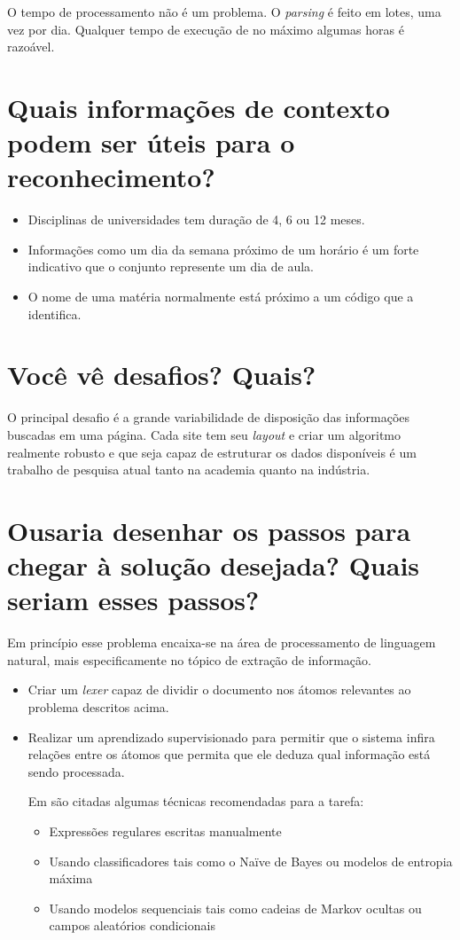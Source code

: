 \documentclass[brazil]{article}
\begin{document}
O tempo de processamento não é um problema. O \emph{parsing} é feito em lotes, 
uma vez por dia. Qualquer tempo de execução de no máximo algumas horas é razoável.


\section{Quais informações de contexto podem ser úteis para o reconhecimento?}
\begin{itemize}
	\item Disciplinas de universidades tem duração de 4, 6 ou 12 meses.
	\item Informações como um dia da semana próximo de um horário é um forte indicativo
	que o conjunto represente um dia de aula.
	\item O nome de uma matéria normalmente está próximo a um código que a identifica.
\end{itemize}


\section{Você vê desafios? Quais?}
O principal desafio é a grande variabilidade de disposição das informações buscadas
em uma página. Cada site tem seu \emph{layout} e criar um algoritmo realmente 
robusto e que seja capaz de estruturar os dados disponíveis é um trabalho de
pesquisa atual tanto na academia quanto na indústria.

\section{Ousaria desenhar os passos para chegar à solução desejada? Quais seriam esses passos?}
Em princípio esse problema encaixa-se na área de processamento de linguagem natural,
mais especificamente no tópico de extração de informação. 

\begin{itemize}
	\item Criar um \emph{lexer} capaz de dividir o documento nos átomos relevantes
	ao problema descritos acima.
	\item Realizar um aprendizado supervisionado para permitir que o sistema infira
	relações entre os átomos que permita que ele deduza qual informação está sendo
	processada. 
	
	Em \cite{wikipedia} são citadas algumas técnicas recomendadas para a tarefa:
	
	\begin{itemize}
		\item Expressões regulares escritas manualmente
		\item Usando classificadores tais como o Naïve de Bayes ou modelos de entropia máxima
		\item Usando modelos sequenciais tais como cadeias de Markov ocultas ou
		campos aleatórios condicionais
	\end{itemize}
\end{itemize}
\end{document}
